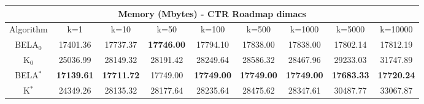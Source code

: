 \begin{tabular}{c|cccccccc}\toprule
\multicolumn{9}{c}{Memory (Mbytes) - CTR Roadmap dimacs}\\ \midrule
Algorithm & k=1 & k=10 & k=50 & k=100 & k=500 & k=1000 & k=5000 & k=10000 \\ \midrule
BELA$_0$ & 17401.36 & 17737.37 & \textbf{17746.00} & 17794.10 & 17838.00 & 17838.00 & 17802.14 & 17812.19 \\
K$_0$ & 25036.99 & 28149.32 & 28191.42 & 28249.64 & 28586.32 & 28467.96 & 29233.03 & 31747.89 \\
BELA$^*$ & \textbf{17139.61} & \textbf{17711.72} & 17749.00 & \textbf{17749.00} & \textbf{17749.00} & \textbf{17749.00} & \textbf{17683.33} & \textbf{17720.24} \\
K$^*$ & 24349.26 & 28135.32 & 28177.64 & 28235.64 & 28475.62 & 28347.61 & 30487.77 & 33067.87 \\ \bottomrule 
\end{tabular}
